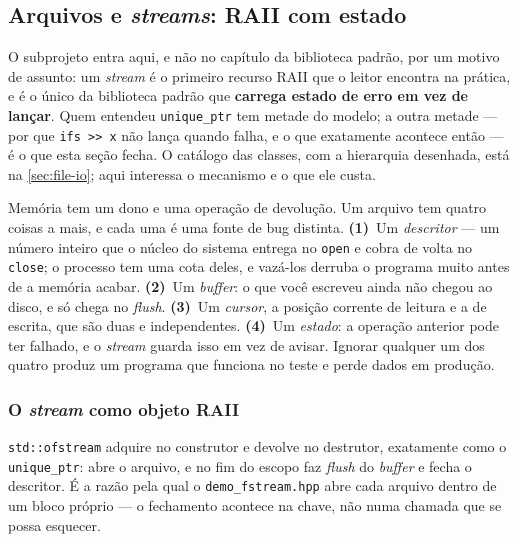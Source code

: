 \subsection{Arquivos e \emph{streams}: RAII com estado}
\label{sec:streams-raii}

O subprojeto  entra aqui, e não no capítulo da biblioteca
padrão, por um motivo de assunto: um \emph{stream} é o primeiro recurso RAII
que o leitor encontra na prática, e é o único da biblioteca padrão que
\textbf{carrega estado de erro em vez de lançar}. Quem entendeu
\texttt{unique\_ptr} tem metade do modelo; a outra metade --- por que
\texttt{ifs >> x} não lança quando falha, e o que exatamente acontece então ---
é o que esta seção fecha. O catálogo das classes, com a hierarquia desenhada,
está na \cref{sec:file-io}; aqui interessa o mecanismo e o que ele custa.

\begin{porque}
Memória tem um dono e uma operação de devolução. Um arquivo tem quatro coisas a
mais, e cada uma é uma fonte de bug distinta. \textbf{(1)}~Um
\emph{descritor} --- um número inteiro que o núcleo do sistema entrega no
\texttt{open} e cobra de volta no \texttt{close}; o processo tem uma cota deles,
e vazá-los derruba o programa muito antes de a memória acabar.
\textbf{(2)}~Um \emph{buffer}: o que você escreveu ainda não chegou ao disco, e
só chega no \emph{flush}. \textbf{(3)}~Um \emph{cursor}, a posição corrente de
leitura e a de escrita, que são duas e independentes. \textbf{(4)}~Um
\emph{estado}: a operação anterior pode ter falhado, e o \emph{stream} guarda
isso em vez de avisar. Ignorar qualquer um dos quatro produz um programa que
funciona no teste e perde dados em produção.
\end{porque}

\subsubsection{O \emph{stream} como objeto RAII}

\texttt{std::ofstream} adquire no construtor e devolve no destrutor, exatamente
como o \texttt{unique\_ptr}: abre o arquivo, e no fim do escopo faz
\emph{flush} do \emph{buffer} e fecha o descritor. É a razão pela qual o
\texttt{demo\_fstream.hpp} abre cada arquivo dentro de um bloco próprio ---
o fechamento acontece na chave, não numa chamada que se possa esquecer.


